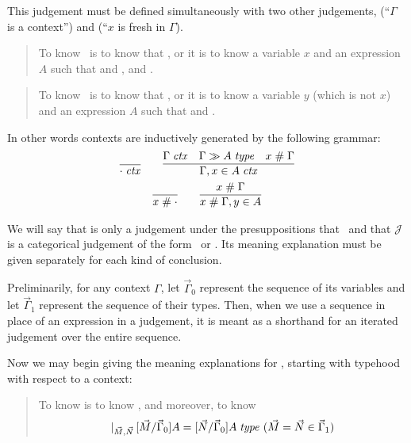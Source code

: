 \documentclass[main.tex]{subfiles}
\begin{document}
This judgement must be defined simultaneously with two other judgements,
\framebox{\isctx{\Gamma}} (``$\Gamma$ is a context'') and
 (``$x$ is fresh in $\Gamma$).

\begin{quote}
  To know \isctx\Gamma\ is to know that \reduce{\Gamma}{\cdot}, or it is to know
  a variable $x$ and an expression $A$ such that 
  and , and .
\end{quote}

\begin{quote}
  To know \ is to know that \reduce{\Gamma}{\cdot}, or it is to know
  a variable $y$ (which is not $x$) and an expression $A$ such that 
  and .
\end{quote}

In other words contexts are inductively generated by the following grammar:
\begin{gather*}
  \infer{\isctx\cdot}{}
  \qquad
  \infer{
    \isctx{\Gamma,\ver{x}{A}}
  }{
    \isctx\Gamma &
    \sequent{\Gamma}{\isset{A}} &
    \fresh{x}{\Gamma}
  }\\
  \infer{\fresh{x}{\cdot}}{}
  \qquad
  \infer{
    \fresh{x}{\Gamma,\ver{y}{A}}
  }{
    \fresh{x}{\Gamma}
  }
\end{gather*}

We will say that  is only a judgement under the
presuppositions that \isctx\Gamma\ and that $\mathcal{J}$ is a categorical
judgement of the form \ or . Its meaning explanation must be
given separately for each kind of conclusion.

Preliminarily, for any context $\Gamma$, let $\vec\Gamma_0$ represent the
sequence of its variables and let $\vec\Gamma_1$ represent the sequence of
their types. Then, when we use a sequence in place of an expression in a
judgement, it is meant as a shorthand for an iterated judgement over the entire
sequence.

Now we may begin giving the meaning explanations for
, starting with typehood with respect to a context:

\begin{quote}
  To know  is to know
  ,
  and moreover, to know
  \[\lvert_{\vec{M},\vec{N}}\,[\vec{M}/\vec\Gamma_0]A =
  [\vec{N}/\vec\Gamma_0]A\;\mathit{type}\ (\vec{M}=\vec{N}\in\vec\Gamma_1)\]
\end{quote}
\end{document}

